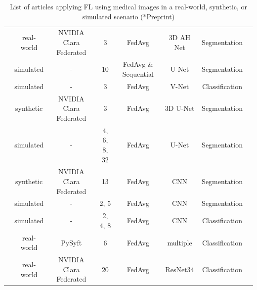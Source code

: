 \begin{table}[h!]
\begin{adjustbox}{width=1\textwidth}
\begin{tabular}{cccccccc}
    \cite{Sarma2021FederatedSharing}                    & real-world & NVIDIA Clara Federated   & 3             & FedAvg                    & 3D AH Net         & Segmentation \\
    \cite{Sheller2020FederatedData}                     & simulated  & -                        & 10            & FedAvg \& Sequential      & U-Net             & Segmentation \\
    \cite{Baheti2020FederatedNodules}                   & simulated  & -                        & 3             & FedAvg                    & V-Net             & Classification \\    
    \cite{Yang2021FederatedJapan}                       & synthetic  & NVIDIA Clara Federated   & 3             & FedAvg                    & 3D U-Net          & Segmentation \\  
    \cite{Sheller2019Multi-institutionalSegmentation}   & simulated  & -                        & 4, 6, 8, 32   & FedAvg                    & U-Net             & Segmentation \\
    \cite{Li2019Privacy-preservingSegmentation}         & synthetic  & NVIDIA Clara Federated   & 13            & FedAvg                    & CNN               & Segmentation \\
    \cite{Andreux2020SiloedDatasets}                    & simulated  & -                        & 2, 5          & FedAvg                    & CNN               & Segmentation \\
    \cite{Yan2020Variation-AwareData}                   & simulated  & -                        & 2, 4, 8       & FedAvg                    & CNN               & Classification \\
    \cite{Lee2021FederatedEnvironment}                  & real-world & PySyft                   & 6             & FedAvg                    & multiple          & Classification \\
    \cite{Flores2021FederatedPatients}\rlap{*}          & real-world & NVIDIA Clara Federated   & 20            & FedAvg                    & ResNet34          & Classification \\
  \end{tabular}
  \end{adjustbox}
  \caption{List of articles applying FL using medical images in a real-world, synthetic, or simulated scenario (*Preprint)}
  \label{tab:LitSearch}
\end{table}





